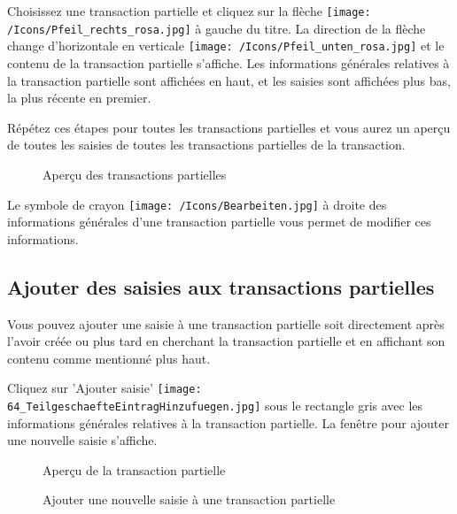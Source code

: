 \vspace{\baselineskip}

Choisissez une transaction partielle et cliquez sur la flèche \texttt{[image: /Icons/Pfeil\_rechts\_rosa.jpg]} à gauche du titre. La direction de la flèche change d'horizontale en verticale \texttt{[image: /Icons/Pfeil\_unten\_rosa.jpg]} et le contenu de la transaction partielle s'affiche. Les informations générales relatives à la transaction partielle sont affichées en haut, et les saisies sont affichées plus bas, la plus récente en premier.

\vspace{\baselineskip}

Répétez ces étapes pour toutes les transactions partielles et vous aurez un aperçu de toutes les saisies de toutes les transactions partielles de la transaction.

\begin{figure}[H]
\caption{Aperçu des transactions partielles}
\end{figure}

Le symbole de crayon \texttt{[image: /Icons/Bearbeiten.jpg]}  à droite des informations générales d'une transaction partielle vous permet de modifier ces informations.

\subsection{Ajouter des saisies aux transactions partielles}

Vous pouvez ajouter une saisie à une transaction partielle soit directement après l'avoir créée ou plus tard en cherchant la transaction partielle et en affichant son contenu comme mentionné plus haut.

Cliquez sur 'Ajouter saisie' \texttt{[image: 64\_TeilgeschaefteEintragHinzufuegen.jpg]}  sous le rectangle gris avec les informations générales relatives à la transaction partielle. La fenêtre pour ajouter une nouvelle saisie s'affiche.

\begin{figure}[H]
\caption{Aperçu de la transaction partielle}
\end{figure}

\begin{figure}[H]
\caption{Ajouter une nouvelle saisie à une transaction partielle}
\end{figure}


